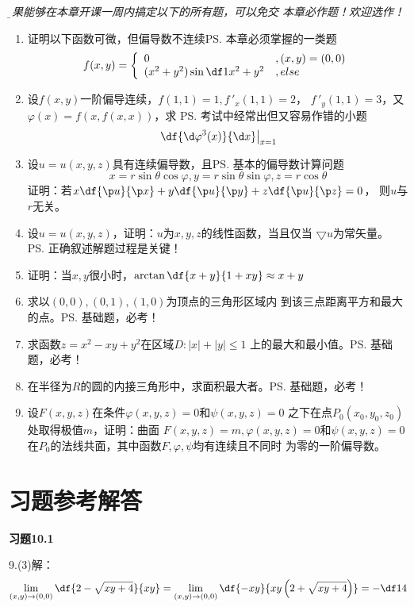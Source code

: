 {\it\b 如果能够在本章开课一周内搞定以下的所有题，可以免交
本章必作题！欢迎选作！}

\begin{enumerate}
  \setlength{\itemindent}{1cm}
  \item 证明以下函数可微，但偏导数不连续\ps{本章必须掌握的一类题}
  	$$
	f(x,y)=\left\{\begin{array}{ll}
	0 & ,(x,y)=(0,0)\\
	(x^2+y^2)\sin\df1{x^2+y^2}& ,else
	\end{array}\right.
	$$
  \item 设$f(x,y)$一阶偏导连续，$f(1,1)=1,f\,'_x(1,1)=2$，
	$f\,'_y(1,1)=3$，又$\varphi(x)=f(x,f(x,x))$，求
	\ps{考试中经常出但又容易作错的小题}
	$$\left.\df{\d\varphi^3(x)}{\d x}\right|_{x=1}$$
  \item 设$u=u(x,y,z)$具有连续偏导数，且\ps{基本的偏导数计算问题}
	$$x=r\sin\theta\cos\varphi,y=r\sin\theta\sin\varphi,z=r\cos\theta$$
	证明：若$x\df{\p u}{\p x}+y\df{\p u}{\p y}+z\df{\p u}{\p z}=0$，
	则$u$与$r$无关。
  \item 设$u=u(x,y,z)$，证明：$u$为$x,y,z$的线性函数，当且仅当
	$\bigtriangledown u$为常矢量。	\ps{正确叙述解题过程是关键！}
  \item 证明：当$x,y$很小时，$\arctan\df{x+y}{1+xy}\approx x+y$
  \item 求以$(0,0),(0,1),(1,0)$为顶点的三角形区域内
	到该三点距离平方和最大的点。\ps{基础题，必考！}
  \item 求函数$z=x^2-xy+y^2$在区域$D:|x|+|y|\leq 1$
	上的最大和最小值。\ps{基础题，必考！}
  \item 在半径为$R$的圆的内接三角形中，求面积最大者。\ps{基础题，必考！}
  \item 设$F(x,y,z)$在条件$\varphi(x,y,z)=0$和$\psi(x,y,z)=0$
	之下在点$P_0(x_0,y_0,z_0)$处取得极值$m$，证明：曲面
	$F(x,y,z)=m,\varphi(x,y,z)=0$和$\psi(x,y,z)=0$
	在$P_0$的法线共面，其中函数$F,\varphi,\psi$均有连续且不同时
	为零的一阶偏导数。
\end{enumerate}

\newpage

\section*{习题参考解答}

{\bf 习题10.1}

9.(3)\;解：
$$
	\lim\limits_{(x,y)\to(0,0)}\df{2-\sqrt{xy+4}}{xy}
	=\lim\limits_{(x,y)\to(0,0)}\df{-xy}{xy\left(2+\sqrt{xy+4}\right)}
	=-\df14
$$

